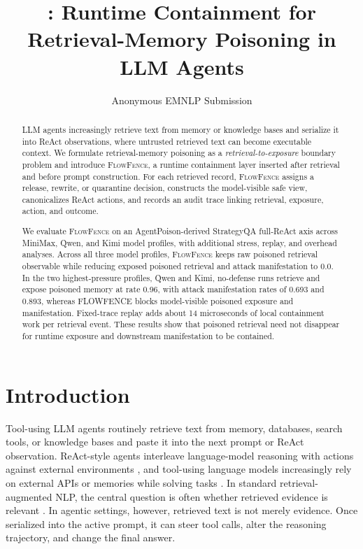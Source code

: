 \documentclass[11pt]{article}
\title{\ff: Runtime Containment for Retrieval-Memory Poisoning in LLM Agents}
\author{Anonymous EMNLP Submission}
\newcommand{\ff}{\textsc{FlowFence}\xspace}
\begin{document}
\maketitle

\begin{abstract}
LLM agents increasingly retrieve text from memory or knowledge bases and serialize it into ReAct observations, where untrusted retrieved text can become executable context. We formulate retrieval-memory poisoning as a \emph{retrieval-to-exposure} boundary problem and introduce \ff, a runtime containment layer inserted after retrieval and before prompt construction. For each retrieved record, \ff assigns a release, rewrite, or quarantine decision, constructs the model-visible safe view, canonicalizes ReAct actions, and records an audit trace linking retrieval, exposure, action, and outcome.

We evaluate \ff on an AgentPoison-derived StrategyQA full-ReAct axis across MiniMax, Qwen, and Kimi model profiles, with additional stress, replay, and overhead analyses. Across all three model profiles, \ff keeps raw poisoned retrieval observable while reducing exposed poisoned retrieval and attack manifestation to
0.0. In the two highest-pressure profiles, Qwen and Kimi, no-defense runs retrieve and expose poisoned memory at rate 0.96, with attack manifestation rates of 0.693 and 0.893, whereas FLOWFENCE blocks model-visible poisoned exposure and manifestation. Fixed-trace replay adds about 14 microseconds of local containment work per retrieval event. These results show that poisoned retrieval need not disappear for runtime exposure and downstream manifestation to be contained.
\end{abstract}

\section{Introduction}

Tool-using LLM agents routinely retrieve text from memory, databases, search tools, or knowledge bases and paste it into the next prompt or ReAct observation. ReAct-style agents interleave language-model reasoning with actions against external environments \citep{react}, and tool-using language models increasingly rely on external APIs or memories while solving tasks \citep{toolformer}. In standard retrieval-augmented NLP, the central question is often whether retrieved evidence is relevant \citep{lewis2020rag,dpr}. In agentic settings, however, retrieved text is not merely evidence. Once serialized into the active prompt, it can steer tool calls, alter the reasoning trajectory, and change the final answer.
\end{document}
